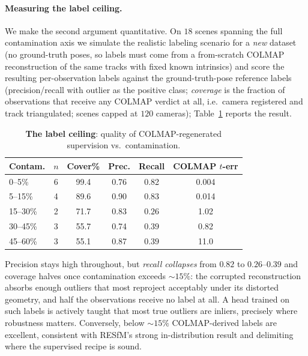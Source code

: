 \documentclass[10pt,twocolumn,letterpaper]{article}
\begin{document}
\paragraph{Measuring the label ceiling.} We make the second argument quantitative. On $18$
scenes spanning the full contamination axis we simulate the realistic labeling scenario for
a \emph{new} dataset (no ground-truth poses, so labels must come from a from-scratch COLMAP
reconstruction of the same tracks with fixed known intrinsics) and score the resulting
per-observation labels against the ground-truth-pose reference labels
(precision/recall with outlier as the positive class; \emph{coverage} is the fraction of
observations that receive any COLMAP verdict at all, i.e.\ camera registered and track
triangulated; scenes capped at $120$ cameras); Table~\ref{tab:ceiling} reports the
result.
\begin{table}[t]\centering\footnotesize
\caption{\textbf{The label ceiling}: quality of COLMAP-regenerated supervision vs.\
contamination.}
\label{tab:ceiling}
\setlength{\tabcolsep}{3.5pt}%
\begin{tabular}{lccccc}
\toprule
Contam. & $n$ & Cover\% & Prec. & Recall & COLMAP $t$-err\\
\midrule
0--5\%    & 6 & 99.4 & 0.76 & 0.82 & 0.004\\
5--15\%   & 4 & 89.6 & 0.90 & 0.83 & 0.014\\
15--30\%  & 2 & 71.7 & 0.83 & $\mathbf{0.26}$ & 1.02\\
30--45\%  & 3 & 55.7 & 0.74 & $\mathbf{0.39}$ & 0.82\\
45--60\%  & 3 & 55.1 & 0.87 & $\mathbf{0.39}$ & 11.0\\
\bottomrule
\end{tabular}
\end{table}
Precision stays high throughout, but \emph{recall collapses} from $0.82$ to
$0.26$--$0.39$ and coverage halves once contamination exceeds ${\sim}15\%$: the corrupted
reconstruction absorbs enough outliers that most reproject acceptably under its distorted
geometry, and half the observations receive no label at all. A head trained on such labels
is actively taught that most true outliers are inliers, precisely where robustness
matters. Conversely, below ${\sim}15\%$ COLMAP-derived labels are excellent, consistent
with RESfM's strong in-distribution result and delimiting where the supervised recipe is
sound.
\end{document}
